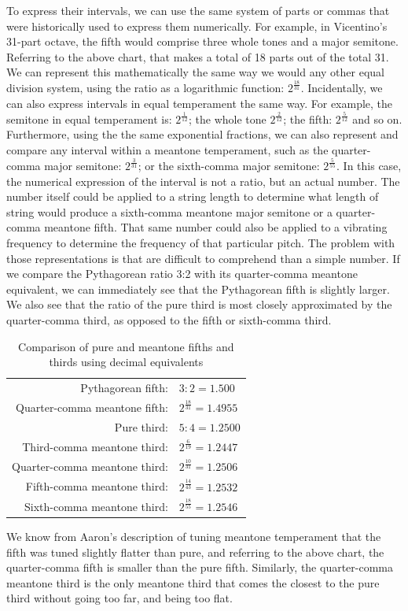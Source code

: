 To express their intervals, we can use the same system of parts or commas
that were historically used to express them numerically.  For example, in Vicentino's
31-part octave, the fifth would comprise three whole tones and a major semitone.
Referring to the above chart, that makes a total of 18 parts out of the total
31.  We can represent this mathematically the same way we would any other equal division
system, using the ratio as a logarithmic function: $2^\frac{18}{31}$.  Incidentally, we can
also express intervals in equal temperament the same way.  For example, the semitone in
equal temperament is: $ 2^\frac{1}{12} $; the whole tone $ 2^\frac{2}{12} $; the fifth:
$ 2^\frac{5}{12} $ and so on.  Furthermore, using the the same exponential fractions,
we can also represent and compare any interval within a meantone temperament, such as
the quarter-comma major semitone: $ 2^\frac{3}{31} $; or the sixth-comma major semitone:
$ 2^\frac{5}{55} $.  In this case, the numerical expression of the interval is not a
ratio, but an actual number.  The number itself could be applied to a string length
to determine what length of string would produce a sixth-comma meantone major semitone
or a quarter-comma meantone fifth.  That same number could also be applied to a vibrating
frequency to determine the frequency of that particular pitch.  The problem with those
representations is that are difficult to comprehend than a simple number.  If we compare the
Pythagorean ratio 3:2 with its quarter-comma meantone equivalent, we can immediately see that
the Pythagorean fifth is slightly larger.  We also see that the ratio of the pure third is
most closely approximated by the quarter-comma third, as opposed to the fifth or sixth-comma
third.
\begin{table}[h!]
    \begin{center}
    \begin{tabular}{ r l }
        Pythagorean fifth:            & $ 3:2 = 1.500 $ \\
        Quarter-comma meantone fifth: & $ 2^\frac{18}{31} = 1.4955 $ \\
        \hline
        Pure third:                   & $ 5:4 = 1.2500 $ \\
        Third-comma meantone third:   & $ 2^\frac{6}{19} = 1.2447 $ \\
        Quarter-comma meantone third: & $ 2^\frac{10}{31} = 1.2506 $ \\
        Fifth-comma meantone third:   & $ 2^\frac{14}{43} = 1.2532 $ \\
        Sixth-comma meantone third:   & $ 2^\frac{18}{55} = 1.2546 $ \\
    \end{tabular}
    \end{center}
    \caption{Comparison of pure and meantone fifths and thirds using decimal equivalents}
\end{table}
We know from Aaron's description of tuning meantone temperament that the fifth was tuned
slightly flatter than pure, and referring to the above chart, the quarter-comma fifth
is smaller than the pure fifth.  Similarly, the quarter-comma meantone third is the
only meantone third that comes the closest to the pure third without going too far,
and being too flat.

